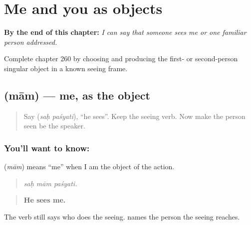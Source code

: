 
\chapter{Me and you as objects}
\label{ch:sa-me-and-you-objects}

\begin{chapteropening}
\textbf{By the end of this chapter:} \emph{I can say that someone sees me or one familiar person addressed.}

Complete chapter 260 by choosing and producing the first- or second-person singular object in a known seeing frame.
\end{chapteropening}

\section[\texorpdfstring{\sk{माम्} (mām)}{माम् (mām)}]{ (mām) — me, as the object}

\label{lesson:SA-C260-mam}



\begin{quote}
Say \textbf{ } (\emph{saḥ paśyati}), “he sees”. Keep the seeing verb. Now make the person seen be the speaker.
\end{quote}

\subsection*{You'll want to know: }
\textbf{} (\emph{mām}) means “me” when I am the object of the action.

\begin{quote}
\textbf{  }
\end{quote}

\begin{quote}
\emph{saḥ mām paśyati.}
\end{quote}

\begin{quote}
\textbf{He sees me.}
\end{quote}

The verb still says who does the seeing. \textbf{} names the person the seeing reaches.


